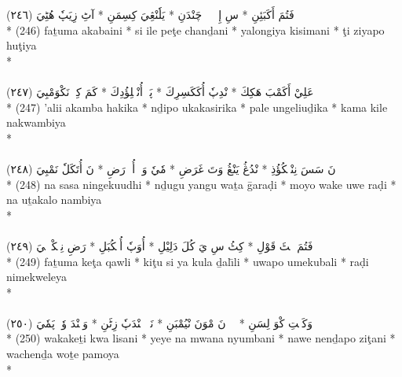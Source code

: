 \documentclass[a4paper, 12pt]{report}
\begin{document}
\begin{center}
\textarabic{(٢٤٦) \textcolor{mygreen}{فَتُمَ أَكَبَئِنِ  * سِ إِلٖ پٖٹٖ چَنْدَنِ  * يَلٗنْڠِيَ كِسِمَنِ  * آٹِ زِيَپٗ هُٹِيَ }} \\* 
(246) faṯuma akabaini  * si ile peţe chanḏani  * yalongiya kisimani  * ţi ziyapo huţiya  \\* 
 \\ 
\\[8mm] 

\textarabic{(٢٤٧) \textcolor{mygreen}{عَلِيْ أَكَمْبَ هَكِكَ  * نْدِپٗ أُكَكَسِرِكَ  * پَلٖ أُنْڠٖلِؤُدِكَ  * كَمَ كِلٖ نَكْوَمْبِيَ }} \\* 
(247) 'alii akamba hakika  * nḏipo ukakasirika  * pale ungeliuḏika  * kama kile nakwambiya  \\* 
 \\ 
\\[8mm] 

\textarabic{(٢٤٨) \textcolor{mygreen}{نَ سَسَ نِنْڠٖكُؤُذِ  * نْدُڠُ يَنْڠُ وَتَ غَرَضِ  * مٗيٗ وَكٖ أُوٖ رَضِ  * نَ أُتَكَلٗ نَمْبِيَ }} \\* 
(248) na sasa ningekuudhi  * nḏugu yangu waṯa ḡaraḍi  * moyo wake uwe raḍi  * na uṯakalo nambiya  \\* 
 \\ 
\\[8mm] 

\textarabic{(٢٤٩) \textcolor{mygreen}{فَتُمَ كٖٹَ قَوْلِ  * كِٹُ سِ يَ كُلَ دَلِيْلِ  * أُوَپٗ أُمٖكُبَلِ  * رَضِ نِمٖكْوٖلٖيَ }} \\* 
(249) faṯuma keţa qawli  * kiţu si ya kula ḏalı̄li  * uwapo umekubali  * raḍi nimekweleya  \\* 
 \\ 
\\[8mm] 

\textarabic{(٢٥٠) \textcolor{mygreen}{وَكَكٖتِ كْوَ لِسَنِ  * يٖيٖ نَ مْوَنَ نْيُمْبَنِ  * نَوٖ نٖنْدَپٗ زِٹَنِ  * وَچٖنْدَ وٗتٖ پَمٗيَ }} \\* 
(250) wakakeṯi kwa lisani  * yeye na mwana nyumbani  * nawe nenḏapo ziţani  * wachenḏa woṯe pamoya  \\* 
 \\ 
\\[8mm] 


\end{center}
\end{document}
